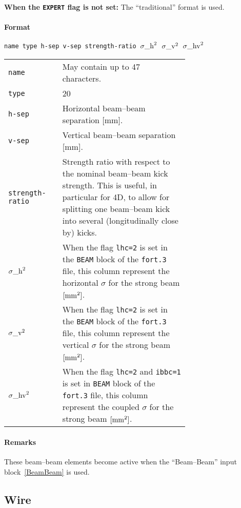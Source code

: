 \bigskip
\noindent\textbf{When the \texttt{EXPERT} flag is not set:}
The ``traditional'' format is used.

\paragraph{Format} \texttt{name type h-sep v-sep strength-ratio ${\sigma\_\rm{h}}^2$ ${\sigma\_\rm{v}}^2$ ${\sigma\_\rm{hv}}^2$}

\bigskip
\begin{longtabu}{@{}lp{0.7\linewidth}}
    \texttt{name}  & May contain up to 47 characters. \\
    \texttt{type}  & 20 \\
    \texttt{h-sep} & Horizontal beam--beam separation [mm]. \\
    \texttt{v-sep} & Vertical beam--beam separation [mm]. \\
    \texttt{strength-ratio} & Strength ratio with respect to the nominal beam--beam kick strength. This is useful, in particular for 4D, to allow for splitting one beam--beam kick into several (longitudinally close by) kicks. \\
    \texttt{${\sigma\_\rm{h}}^2$} & When the flag \texttt{lhc=2} is set in the \texttt{BEAM} block of the \texttt{fort.3} file, this column represent the horizontal $\sigma$ for the strong beam $\rm{[mm^2]}$. \\
    \texttt{${\sigma\_\rm{v}}^2$} & When the flag  \texttt{lhc=2} is set in the \texttt{BEAM} block of the \texttt{fort.3} file, this column represent the vertical $\sigma$ for the strong beam $\rm{[mm^2]}$. \\
    \texttt{${\sigma\_\rm{hv}}^2$} & When the flag  \texttt{lhc=2} and  \texttt{ibbc=1} is set in \texttt{BEAM} block of the \texttt{fort.3} file, this column represent the coupled $\sigma$ for the strong beam $\rm{[mm^2]}$. \\
\end{longtabu}

\paragraph{Remarks}
These beam--beam elements become active when the ``Beam--Beam'' input block~\ref{BeamBeam} is used.

\subsection{Wire} \label{WIRE}

